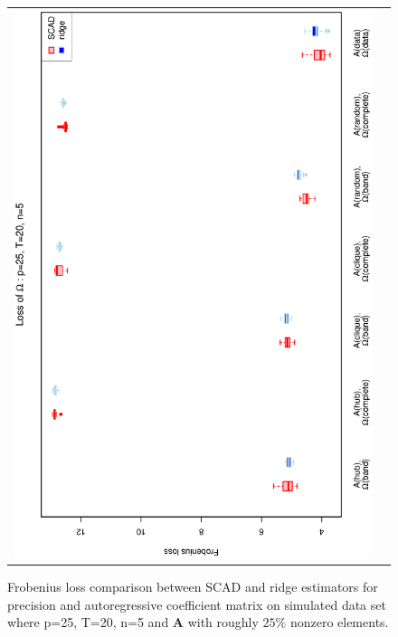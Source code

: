 \begin{figure}[h!]
\begin{tabular}{cc}
\includegraphics[scale=0.45,angle=270]{LossOmega25T20N5_25.eps}
\end{tabular}
\caption{Frobenius loss comparison between SCAD and ridge estimators for precision and autoregressive coefficient matrix on simulated data set where p=25, T=20, n=5 and $\mathbf{A}$ with roughly $25\%$ nonzero elements.}
\label{figSM:Loss25T20N5_25}
\end{figure}


